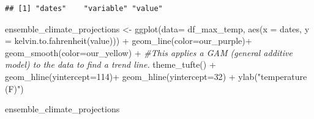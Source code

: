 \documentclass[
  paper=a4,
  ,captions=tableheading
]{scrartcl}
\newenvironment{Shaded}{\begin{snugshade}}{\end{snugshade}}
\newcommand{\AttributeTok}[1]{\textcolor[rgb]{0.77,0.63,0.00}{#1}}
\newcommand{\CommentTok}[1]{\textcolor[rgb]{0.56,0.35,0.01}{\textit{#1}}}
\newcommand{\DecValTok}[1]{\textcolor[rgb]{0.00,0.00,0.81}{#1}}
\newcommand{\FunctionTok}[1]{\textcolor[rgb]{0.00,0.00,0.00}{#1}}
\newcommand{\NormalTok}[1]{#1}
\newcommand{\OtherTok}[1]{\textcolor[rgb]{0.56,0.35,0.01}{#1}}
\newcommand{\SpecialCharTok}[1]{\textcolor[rgb]{0.00,0.00,0.00}{#1}}
\newcommand{\StringTok}[1]{\textcolor[rgb]{0.31,0.60,0.02}{#1}}
\begin{document}
\begin{Shaded}
\end{Shaded}

\begin{verbatim}
## [1] "dates"    "variable" "value"
\end{verbatim}

\begin{Shaded}
\begin{Highlighting}[]
\NormalTok{ensemble\_climate\_projections }\OtherTok{\textless{}{-}} \FunctionTok{ggplot}\NormalTok{(}\AttributeTok{data=}\NormalTok{ df\_max\_temp, }\FunctionTok{aes}\NormalTok{(}\AttributeTok{x =}\NormalTok{ dates, }\AttributeTok{y =} \FunctionTok{kelvin.to.fahrenheit}\NormalTok{(value))) }\SpecialCharTok{+} 
  \FunctionTok{geom\_line}\NormalTok{(}\AttributeTok{color=}\NormalTok{our\_purple)}\SpecialCharTok{+}
  \FunctionTok{geom\_smooth}\NormalTok{(}\AttributeTok{color=}\NormalTok{our\_yellow) }\SpecialCharTok{+} \CommentTok{\#This applies a GAM (general additive model) to the data to find a trend line. }
  \FunctionTok{theme\_tufte}\NormalTok{() }\SpecialCharTok{+}
  \FunctionTok{geom\_hline}\NormalTok{(}\AttributeTok{yintercept=}\DecValTok{114}\NormalTok{)}\SpecialCharTok{+}
  \FunctionTok{geom\_hline}\NormalTok{(}\AttributeTok{yintercept=}\DecValTok{32}\NormalTok{) }\SpecialCharTok{+} 
  \FunctionTok{ylab}\NormalTok{(}\StringTok{"temperature (F)"}\NormalTok{)}

\NormalTok{ensemble\_climate\_projections}
\end{Highlighting}
\end{Shaded}
\end{document}
